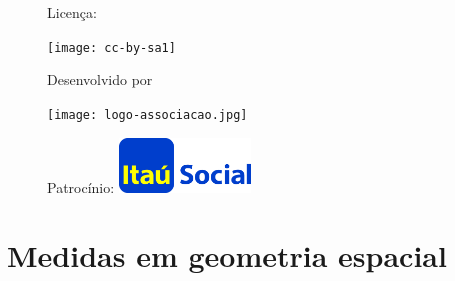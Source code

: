 \begin{figure}[b]
\begin{minipage}[l]{5cm}
\centering

{\large Licença:}

  \texttt{[image: cc-by-sa1]}
\end{minipage}\hfill
\begin{minipage}[c]{5cm}
\centering
{\large Desenvolvido por}

\texttt{[image: logo-associacao.jpg]}
\end{minipage}
\begin{minipage}[r]{5cm}
\centering

{\large Patrocínio:}
  \vspace{1em}
  \includegraphics[width=3.5cm]{itau}
\end{minipage}
\end{figure}

\mainmatter

\chapter{Medidas em geometria espacial}
\label{\detokenize{GE504:medidas-em-geometria-espacial}}\label{\detokenize{GE504::doc}}

\label{\detokenize{GE504-0:explorando-o-conceito-de-volume}}\label{\detokenize{GE504-0::doc}}


